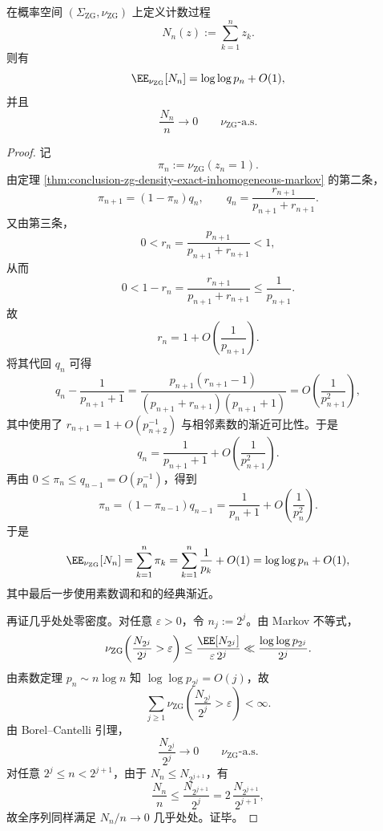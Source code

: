 \begin{theorem}[算术自然密度测度的稀疏律]\label{thm:conclusion-zg-density-measure-sparsity-law}
在概率空间 \((\Sigma_{\mathrm{ZG}},\nu_{\mathrm{ZG}})\) 上定义计数过程
\[
N_n(z):=\sum_{k=1}^{n}z_k.
\]
则有
\[
\EE_{\nu_{\mathrm{ZG}}}[N_n]=\log\log p_n+O(1),
\]
并且
\[
\frac{N_n}{n}\longrightarrow 0
\qquad
\nu_{\mathrm{ZG}}\text{-a.s.}
\]
\end{theorem}
\begin{proof}
记
\[
\pi_n:=\nu_{\mathrm{ZG}}(z_n=1).
\]
由定理 \ref{thm:conclusion-zg-density-exact-inhomogeneous-markov} 的第二条，
\[
\pi_{n+1}=(1-\pi_n)q_n,
\qquad
q_n=\frac{r_{n+1}}{p_{n+1}+r_{n+1}}.
\]
又由第三条，
\[
0<r_n=\frac{p_{n+1}}{p_{n+1}+r_{n+1}}<1,
\]
从而
\[
0<1-r_n=\frac{r_{n+1}}{p_{n+1}+r_{n+1}}\le \frac1{p_{n+1}}.
\]
故
\[
r_n=1+O\!\left(\frac1{p_{n+1}}\right).
\]
将其代回 \(q_n\) 可得
\[
q_n-\frac{1}{p_{n+1}+1}
=
\frac{p_{n+1}(r_{n+1}-1)}
{(p_{n+1}+r_{n+1})(p_{n+1}+1)}
=
O\!\left(\frac1{p_{n+1}^2}\right),
\]
其中使用了 \(r_{n+1}=1+O(p_{n+2}^{-1})\) 与相邻素数的渐近可比性。于是
\[
q_n=\frac{1}{p_{n+1}+1}+O\!\left(\frac1{p_{n+1}^2}\right).
\]
再由 \(0\le \pi_n\le q_{n-1}=O(p_n^{-1})\)，得到
\[
\pi_n
=
(1-\pi_{n-1})q_{n-1}
=
\frac{1}{p_n+1}+O\!\left(\frac1{p_n^2}\right).
\]
于是
\[
\EE_{\nu_{\mathrm{ZG}}}[N_n]
=
\sum_{k=1}^{n}\pi_k
=
\sum_{k=1}^{n}\frac1{p_k}+O(1)
=
\log\log p_n+O(1),
\]
其中最后一步使用素数调和和的经典渐近。

再证几乎处处零密度。对任意 \(\varepsilon>0\)，令 \(n_j:=2^j\)。由 Markov 不等式，
\[
\nu_{\mathrm{ZG}}\!\left(\frac{N_{2^j}}{2^j}>\varepsilon\right)
\le
\frac{\EE[N_{2^j}]}{\varepsilon\,2^j}
\ll
\frac{\log\log p_{2^j}}{2^j}.
\]
由素数定理 \(p_n\sim n\log n\) 知 \(\log\log p_{2^j}=O(j)\)，故
\[
\sum_{j\ge 1}\nu_{\mathrm{ZG}}\!\left(\frac{N_{2^j}}{2^j}>\varepsilon\right)<\infty.
\]
由 Borel--Cantelli 引理，
\[
\frac{N_{2^j}}{2^j}\to 0
\qquad
\nu_{\mathrm{ZG}}\text{-a.s.}
\]
对任意 \(2^j\le n<2^{j+1}\)，由于 \(N_n\le N_{2^{j+1}}\)，有
\[
\frac{N_n}{n}\le \frac{N_{2^{j+1}}}{2^j}
=
2\,\frac{N_{2^{j+1}}}{2^{j+1}},
\]
故全序列同样满足 \(N_n/n\to 0\) 几乎处处。证毕。
\end{proof}

